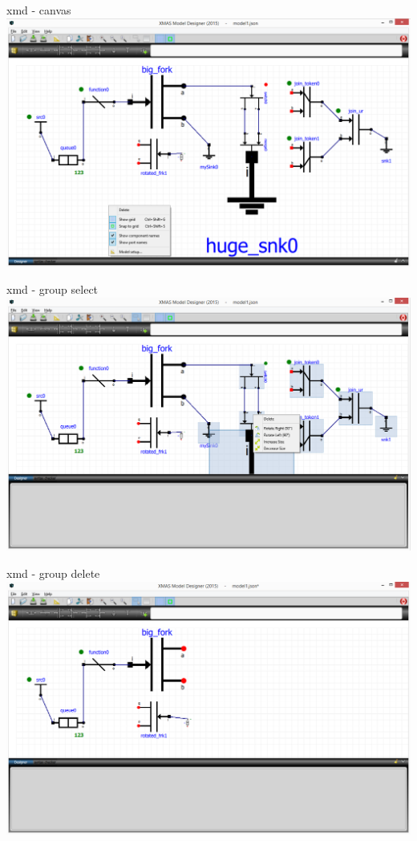 \documentclass[11pt]{beamer}
\begin{document}
\begin{frame}{xmd - canvas}
	\includegraphics[width=.90\linewidth]{pictures/2e-xmd-canvas}
\end{frame}
\begin{frame}{xmd - group select}
	\includegraphics[width=.90\linewidth]{pictures/2f-xmd-canvas-groupselect}
\end{frame}
\begin{frame}{xmd - group delete}
	\includegraphics[width=.90\linewidth]{pictures/2g-xmd-canvas-delete}
\end{frame}
\end{document}
